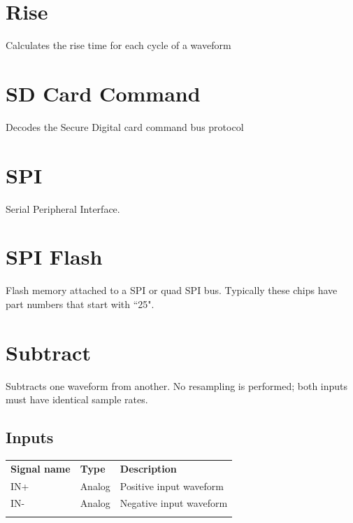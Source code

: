 \section{Rise}

Calculates the rise time for each cycle of a waveform

\pagebreak
\section{SD Card Command}

Decodes the Secure Digital card command bus protocol

\pagebreak
\section{SPI}

Serial Peripheral Interface.

\pagebreak
\section{SPI Flash}

Flash memory attached to a SPI or quad SPI bus. Typically these chips have part numbers that start with ``25".

\pagebreak
\section{Subtract}


Subtracts one waveform from another. No resampling is performed; both inputs must have identical sample rates.

\subsection{Inputs}

\begin{tabularx}{16cm}{llX}
\thickhline
\textbf{Signal name} & \textbf{Type} & \textbf{Description} \\
\thickhline
IN+ & Analog & Positive input waveform \\
\thickhline
IN- & Analog & Negative input waveform \\
\thickhline
\end{tabularx}


